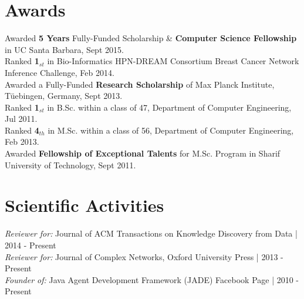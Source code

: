 \documentclass[letter]{res}
\begin{document}
\begin{resume}
\begin{enumerate}[leftmargin=-.01in]
		\end{enumerate}
		
		
		\section{Awards}
		Awarded \textbf{5 Years} Fully-Funded Scholarship \& \textbf{Computer Science Fellowship} in UC Santa Barbara, Sept 2015.\\
		Ranked \textbf{1}$_{st}$ in Bio-Informatics HPN-DREAM Consortium Breast Cancer Network Inference Challenge, Feb 2014.\\
		Awarded a Fully-Funded \textbf{Research Scholarship} of Max Planck Institute, Tüebingen, Germany, Sept 2013.\\
		Ranked \textbf{1}$_{st}$ in B.Sc. within a class of 47, Department of Computer Engineering, Jul 2011.\\
		Ranked \textbf{4}$_{th}$ in M.Sc. within a class of 56, Department of Computer Engineering, Feb 2013.\\
		Awarded \textbf{Fellowship of Exceptional Talents} for M.Sc. Program in Sharif University of Technology, Sept 2011.
		
		
		\section{Scientific Activities}
		{\sl Reviewer for:  }Journal of ACM Transactions on Knowledge Discovery from Data | 2014 - Present\\
		{\sl Reviewer for:  }Journal of Complex Networks, Oxford University Press | 2013 - Present\\
		{\sl Founder of:  }Java Agent Development Framework (JADE) Facebook Page | 2010 - Present
		
		
		

\end{resume}
\end{document}
